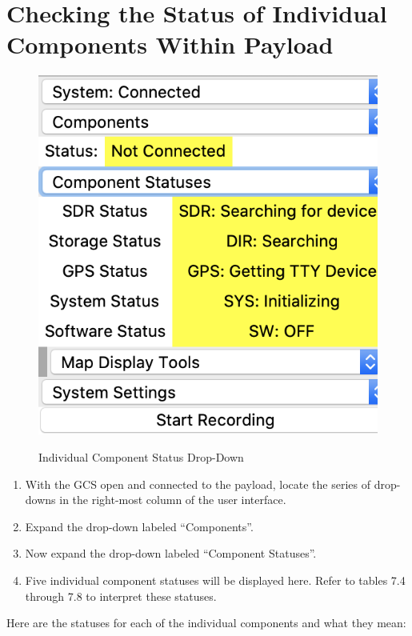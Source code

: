 \documentclass{report}
\begin{document}
		\section{Checking the Status of Individual Components Within Payload}
			\begin{figure}[htb]
				\centering
				\caption{Individual Component Status Drop-Down}
				\includegraphics[scale=0.5]{ind_comp_statuses_dd.jpg}
				\label{fig:ind_comp_statuses_dd}
			\end{figure}
			\begin{enumerate}
				\item With the GCS open and connected to the payload, locate the series of drop-downs in the right-most column of the user interface.
				\item Expand the drop-down labeled ``Components''.
				\item Now expand the drop-down labeled ``Component Statuses''.
				\item Five individual component statuses will be displayed here. Refer to tables 7.4 through 7.8 to interpret these statuses.
			\end{enumerate}
			Here are the statuses for each of the individual components and what they mean: \\
			
\end{document}
